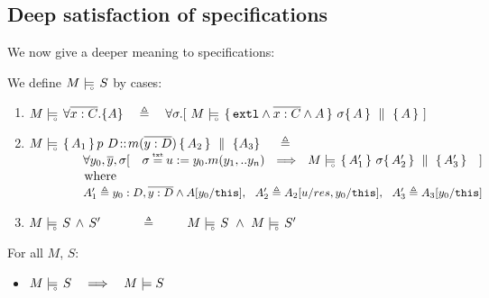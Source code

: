  
 
\subsection{Deep satisfaction of specifications} 
\label{sect:HLmeans}



We now give a deeper meaning to specifications: 

\begin{definition} 

We define $M \models\!\!\!\!_{_{\circ}}\  {S} $ by cases: %

\label{def:necessity-semantics:strong}

\begin{enumerate}
\item
{ 
$\satisfiesD{M}{\TwoStatesN {\overline {x:C}} {A}} \ \  \ \triangleq   \ \ \ 
\forall \sigma.[\  \satisfiesD {M} {\quadruple {\externalexec \wedge \overline {x:C} \wedge A} {\sigma} {A} {A} } \ ] $
}
  \item
 {$\satisfiesD{M} { \mprepostN {A_1}{p\ D}{m}{y}{D}{A_2} {A_3}    }\  \ \ \   \triangleq  \ \ \ $}\\ 
 {
$\strut  \ \ \   \ \ \ \ \ \ \ \ \   \    \forall   y_0,\overline y, \sigma[ \ \ \ \sigma\txteq {u:=y_0.m(y_1,..y_n)} \ \ \Longrightarrow \ \ 
\satisfiesD {M} {\quadruple  {A_1'} }   {\sigma}   {A_2' } {A_3' }  \  \ \  ]$ } \\
$\strut \ \ \   \ \ \ \ \ \ \ \ \   \  \mbox{where}$\\
$\strut  \ \ \   \ \ \ \ \ \ \ \ \   \  \ A_1' \triangleq   y_0:D,{\overline {y:D}}   \wedge   A[y_0/\mbox{\normalfont{\texttt{this}}}],\  \  A_2' \triangleq A_2[u/res,y_0/\mbox{\normalfont{\texttt{this}}}],\ \ A_3' \triangleq A_3[y_0/\mbox{\normalfont{\texttt{this}}}] $
 \item
 $M \models\!\!\!\!_{_{\circ}}\  S\, \wedge\, S' $\ \ \  \ \ \  $\triangleq$  \  \ \  \   $\satisfiesD{M}{S}\ \wedge \ \satisfiesD{M}{S'}$
\end{enumerate}
\end{definition}

 \begin{lemma}
For all $M$, $S$:
\begin{itemize}
\item
$\satisfiesD {M} {S}   \ \ \ \Longrightarrow \ \ \ \satisfies  {M} {S} $
\end{itemize}
\end{lemma}

